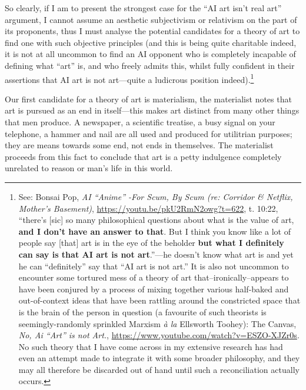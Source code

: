 \documentclass[11pt]{article}
\begin{document}
So clearly, if I am to present the strongest case for the ``AI art isn't real art'' argument, I cannot assume an aesthetic subjectivism or relativism on the part of its proponents, thus I must analyse the potential candidates for a theory of art to find one with such objective principles (and this is being quite charitable indeed, it is not at all uncommon to find an AI opponent who is completely incapable of defining what ``art'' is, and who freely admits this, whilst fully confident in their assertions that AI art is not art---quite a ludicrous position indeed).\footnote{See: Bonsai Pop, \emph{AI ``Anime'' -For Scum, By Scum (re: Corridor \& Netflix, Mother's Basement)}, \url{https://youtu.be/pkU2RmN2owg?t=622}, t. 10:22, ``there's [sic] so many philosophical questions about what is the value of art, \textbf{and I don't have an answer to that}. But I think you know like a lot of people say [that] art is in the eye of the beholder \textbf{but what I definitely can say is that AI art is not art}.''---he doesn't know what art is and yet he can ``definitely'' say that ``AI art is not art.'' It is also not uncommon to encounter some tortured mess of a theory of art that--ironically--appears to have been conjured by a process of mixing together various half-baked and out-of-context ideas that have been rattling around the constricted space that is the brain of the person in question (a favourite of such theorists is seemingly-randomly sprinkled Marxism \emph{à la} Ellsworth Toohey): The Canvas, \emph{No, Ai ``Art'' is not Art.}, \url{https://www.youtube.com/watch?v=ESZO-XJZr0s}. No such theory that I have come across in my extensive research has had even an attempt made to integrate it with some broader philosophy, and they may all therefore be discarded out of hand until such a reconciliation actually occurs.}

Our first candidate for a theory of art is materialism, the materialist notes that art is pursued as an end in itself---this makes art distinct from many other things that men produce. A newspaper, a scientific treatise, a busy signal on your telephone, a hammer and nail are all used and produced for utilitrian purposes; they are means towards some end, not ends in themselves. The materialist proceeds from this fact to conclude that art is a petty indulgence completely unrelated to reason or man's life in this world.
\end{document}
